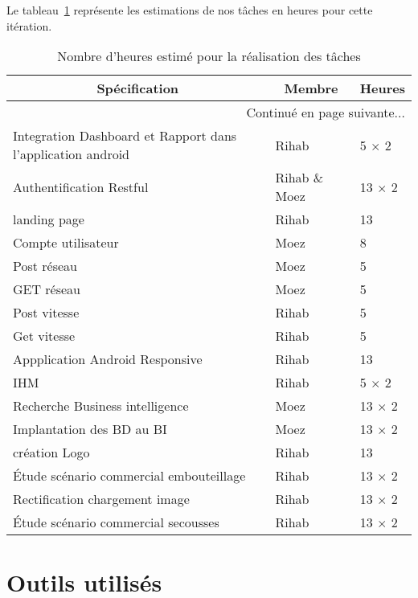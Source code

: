 Le tableau~\ref{tab:sprint3-estimation} représente les estimations de nos tâches
en heures pour cette itération.

\begin{center}
    \begin{longtable}{| l | l | l |}
        \caption{Nombre d'heures estimé pour la réalisation des tâches}
\label{tab:sprint3-estimation} \\

 \hline
 \multicolumn{1}{|c}{\textbf{Spécification}} &
 \multicolumn{1}{|c}{\textbf{Membre}} &
 \multicolumn{1}{|c|}{\textbf{Heures}} \\ \hline
 \endhead

 \hline \multicolumn{3}{|r|}{{Continué en page suivante$\dotsc$}} \\ \hline
 \endfoot

 \hline \hline
 \endlastfoot

\hline
Integration Dashboard et Rapport dans l'application android & Rihab & 5 $\times$ 2 \\ \hline
Authentification Restful& Rihab \& Moez & 13 $\times$ 2 \\ \hline
landing page& Rihab & 13 \\ \hline
Compte utilisateur& Moez & 8 \\ \hline
Post réseau& Moez & 5  \\ \hline
GET réseau& Moez & 5  \\ \hline
Post vitesse& Rihab & 5  \\ \hline
Get vitesse& Rihab & 5  \\ \hline
Appplication Android Responsive & Rihab & 13 \\ \hline
IHM & Rihab & 5 $\times$ 2 \\ \hline
Recherche Business intelligence& Moez & 13 $\times$ 2 \\ \hline
Implantation des BD au BI& Moez & 13 $\times$ 2 \\ \hline
création Logo& Rihab & 13 \\ \hline
Étude scénario commercial embouteillage& Rihab & 13 $\times$ 2 \\ \hline
Rectification chargement image & Rihab & 13 $\times$ 2 \\ \hline
Étude scénario commercial secousses & Rihab & 13 $\times$ 2 \\ \hline
\end{longtable}
\end{center}

\section{Outils utilisés}

